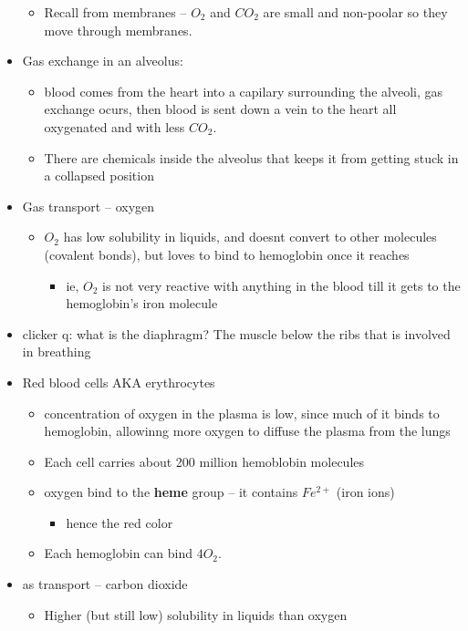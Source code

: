 \documentclass{article}
\theoremstyle{definition}
\begin{document}
\begin{itemize}
\begin{itemize}
			\item Recall from membranes -- $O_2$ and $CO_2$ are small and non-poolar so they move through membranes.
		\end{itemize}
	\item Gas exchange in an alveolus:
		\begin{itemize}
			\item blood comes from the heart into a capilary surrounding the alveoli, gas exchange ocurs, then blood is sent down a vein to the heart all oxygenated and with less $CO_2.$
			\item There are chemicals inside the alveolus that keeps it from getting stuck in a collapsed position
		\end{itemize}
	\item Gas transport -- oxygen
		\begin{itemize}
			\item $O_2$ has low solubility in liquids, and doesnt convert to other molecules (covalent bonds), but loves to bind to hemoglobin once it reaches
				\begin{itemize}
					\item ie, $O_2$ is not very reactive with anything in the blood till it gets to the hemoglobin's iron molecule 
				\end{itemize}
		\end{itemize}
	\item clicker q: what is the diaphragm? The muscle below the ribs that is involved in breathing
	\item Red blood cells AKA erythrocytes
		\begin{itemize}
			\item concentration of oxygen in the plasma is low, since much of it binds to hemoglobin, allowinng more oxygen to diffuse the plasma from the lungs
			\item Each cell carries about 200 million hemoblobin molecules
			\item oxygen bind to the \textbf{heme} group -- it contains $Fe^{2+}$ (iron ions)
				\begin{itemize}
					\item hence the red color
				\end{itemize}
			\item Each hemoglobin can bind $4O_2.$
		\end{itemize}
	\item as transport -- carbon dioxide
		\begin{itemize}
			\item Higher (but still low) solubility in liquids than oxygen

\end{itemize}
\end{itemize}
\end{document}
